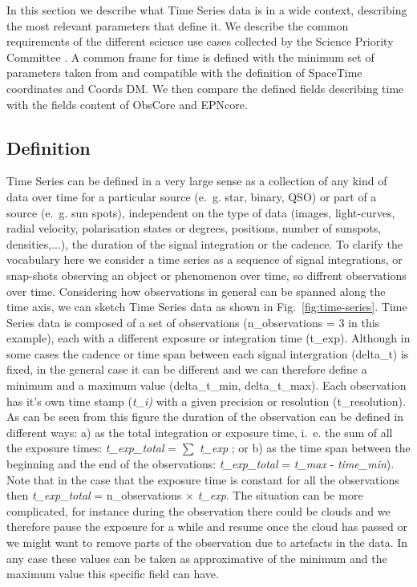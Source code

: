 \documentclass[11pt,a4paper]{ivoa}
\begin{document}
In this section we describe what Time Series data is in a wide context, describing the most relevant parameters that define it. We describe the common requirements of the different science use cases collected by the Science Priority Committee \cite{SPC_UC}. A common frame for time is defined with the minimum set of parameters taken from and compatible with the definition of SpaceTime coordinates and Coords DM. We then compare the defined fields describing time with the fields content of ObsCore and EPNcore.

\subsection{Definition}
Time Series can be defined in a very large sense as a collection of any kind of data over time for a particular source (e.~g. star, binary, QSO) or part of a source (e.~g. sun spots), independent on the type of data (images, light-curves, radial velocity, polarisation states or degrees, positions, number of sunspots, densities,...), the duration of the signal integration or the cadence.
To clarify the vocabulary here we consider a time series as a sequence of signal integrations, or snap-shots observing  an object or phenomenon over time, so diffrent observations over time.
Considering how observations in general can be spanned along the time axis, we can sketch Time Series data as shown in Fig.~\ref{fig:time-series}. Time Series data is composed of a set of observations (n\_observations = 3 in this example), each with a different exposure or integration time (t\_exp). Although in some cases the cadence or time span between each signal intergration (delta\_t) is fixed, in the general case it can be different and we can therefore define a minimum and a maximum value (delta\_t\_min, delta\_t\_max). Each observation has it's own time stamp (\emph{t\_i)} with a given precision or resolution (t\_resolution). As can be seen from this figure the duration of the observation can be defined in different ways: a) as the total integration or exposure time, i.~e. the sum of all the exposure times: \emph{t\_exp\_total }= $\sum$ \emph{t\_exp} ; or b) as the time span between the beginning and the end of the observations: \emph{t\_exp\_total} = \emph{t\_max} - \emph{time\_min}). Note that in the case that the exposure time is constant for all the observations then \emph{t\_exp\_total }= n\_observations $\times$ \emph{t\_exp}. The situation can be more complicated, for instance during the observation there could be clouds and we therefore pause the exposure for a while and resume once the cloud has passed or we might want to remove parts of the observation due to artefacts in the data. In any case these values can be taken as approximative of the minimum and the maximum value this specific field can have.
\end{document}
